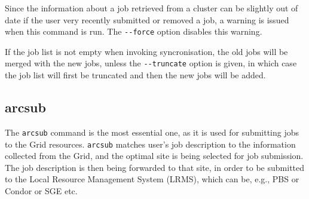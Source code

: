 Since  the  information  about  a job retrieved from a cluster can be slightly out of date if the user very recently
submitted or removed a job, a warning is issued when this command is run. The \verb#--force# option disables this warning.

If the job list is not empty when invoking syncronisation, the old jobs will be merged with the new jobs, unless the \verb#--truncate# option is given, in which case the job list will first be truncated and then the new jobs will be added.

\subsection{arcsub}\label{sec:arcsub}
The \texttt{arcsub} command is the
most essential one, as it is used for submitting jobs to the Grid
resources. \texttt{arcsub} matches user's job
description to the information collected from the Grid, and the
optimal site is being selected for job submission. The job description
is then being forwarded to that site, in order to be submitted to the
Local Resource Management System (LRMS), which can be, e.g., PBS or
Condor or SGE etc.

